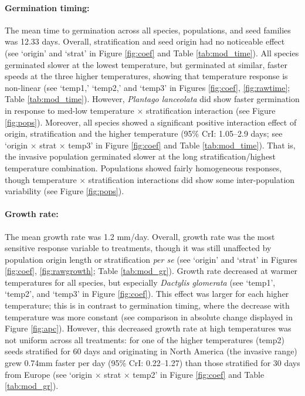\documentclass[11pt]{article}\usepackage[]{graphicx}\usepackage[]{color}
\begin{document}
	\paragraph{Germination timing:} The mean time to germination across all species, populations, and seed families was 12.33 days.   Overall, stratification and seed origin had no noticeable effect (see `origin' and `strat' in Figure \ref{fig:coef} and Table \ref{tab:mod_time}). All species germinated slower at the lowest temperature, but germinated at similar, faster speeds at the three higher temperatures, showing that temperature response is non-linear  (see `temp1,' `temp2,' and `temp3' in Figures \ref{fig:coef}, \ref{fig:rawtime}; Table \ref{tab:mod_time}). However, \textit{Plantago lanceolata} did show faster germination in response to med-low temperature $\times$ stratification interaction (see Figure \ref{fig:pops}).  Moreover, all species showed a significant positive interaction effect of origin, stratification and the higher temperature (95\% CrI: 1.05--2.9 days; see `origin $\times$ strat $\times$ temp3' in Figure \ref{fig:coef} and Table \ref{tab:mod_time}). That is, the invasive population germinated slower at the long stratification/highest temperature combination. Populations showed fairly homogeneous responses, though temperature $\times$ stratification interactions did show some inter-population variability (see Figure \ref{fig:pops}). 
	\paragraph{Growth rate:} The mean growth rate was 1.2 mm/day. Overall, growth rate was the most sensitive response variable to treatments, though it was still unaffected by population origin length or stratification \textit{per se} (see `origin' and `strat' in Figures \ref{fig:coef}, \ref{fig:rawgrowth}; Table \ref{tab:mod_gr}). Growth rate decreased at warmer temperatures for all species, but especially \textit{Dactylis glomerata} (see `temp1', `temp2', and `temp3' in Figure \ref{fig:coef}). This effect was larger for each higher temperature; this is in contrast to germination timing, where the decrease with temperature was more constant (see comparison in absolute change displayed in Figure \ref{fig:apc}). However, this decreased growth rate at high temperatures was not uniform across all treatments: for one of the higher temperatures (temp2) seeds stratified for 60 days and originating in North America (the invasive range) grew 0.74mm faster per day (95\% CrI: 0.22--1.27) than those stratified for 30 days from Europe (see `origin $\times$ strat $\times$ temp2' in Figure \ref{fig:coef} and Table \ref{tab:mod_gr}). 
\end{document}
